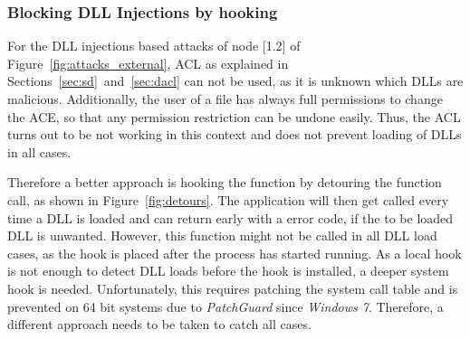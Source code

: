 \subsubsection{Blocking DLL Injections by hooking }
For the \gls{DLL} injections based attacks of node [1.2] of Figure~\ref{fig:attacks_external}, \gls{ACL} as explained in Sections~\ref{sec:sd}~and~\ref{sec:dacl} can not be used, as it is unknown which \glspl{DLL} are malicious. Additionally, the user of a file has always full permissions to change the \gls{ACE}, so that any permission restriction can be undone easily. Thus, the \gls{ACL} turns out to be not working in this context and does not prevent loading of \glspl{DLL} in all cases. 

Therefore a better approach is hooking the  function by detouring the function call, as shown in Figure~\ref{fig:detours}. The application will then get called every time a \gls{DLL} is loaded and can return early with a  error code, if the to be loaded \gls{DLL} is unwanted. However, this function might not be called in all \gls{DLL} load cases, as the hook is placed after the process has started running. As a local hook is not enough to detect \gls{DLL} loads before the hook is installed, a deeper system hook is needed. Unfortunately, this requires patching the system call table and is prevented on 64 bit systems due to \emph{PatchGuard} since \emph{Windows 7}. Therefore, a different approach needs to be taken to catch all cases.